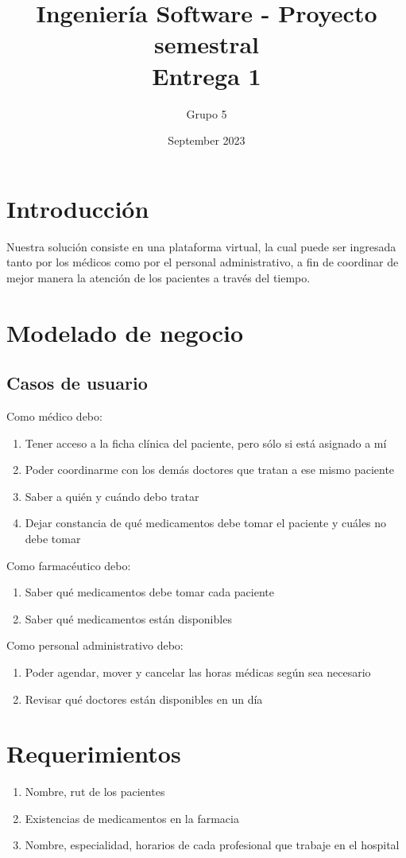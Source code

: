 \documentclass{article}
\title{Ingeniería Software - Proyecto semestral \\ Entrega 1 }
\author{Grupo 5}
\date{September 2023}
\begin{document}
\maketitle

\section{Introducción}

Nuestra solución consiste en una plataforma virtual, la cual puede ser ingresada tanto por los médicos como por el personal administrativo, a fin de coordinar de mejor manera la atención de los pacientes a través del tiempo.

\section{Modelado de negocio}
\subsection*{Casos de usuario}
Como médico debo:
\begin{enumerate}
    \item{Tener acceso a la ficha clínica del paciente, pero sólo si está asignado a mí}
    \item{Poder coordinarme con los demás doctores que tratan a ese mismo paciente}
    \item{Saber a quién y cuándo debo tratar}
    \item{Dejar constancia de qué medicamentos debe tomar el paciente y cuáles no debe tomar}
\end{enumerate}
\vspace{5mm}
Como farmacéutico debo:
\begin{enumerate}
    \item{Saber qué medicamentos debe tomar cada paciente}
    \item{Saber qué medicamentos están disponibles}
\end{enumerate}
\vspace{5mm}
Como personal administrativo debo:
\begin{enumerate}
    \item{Poder agendar, mover y cancelar las horas médicas según sea necesario}
    \item{Revisar qué doctores están disponibles en un día}
\end{enumerate}

\section{Requerimientos}
\begin{enumerate}
    \item{Nombre, rut de los pacientes}
    \item{Existencias de medicamentos en la farmacia}
    \item{Nombre, especialidad, horarios de cada profesional que trabaje en el hospital}
\end{enumerate}
\end{document}
